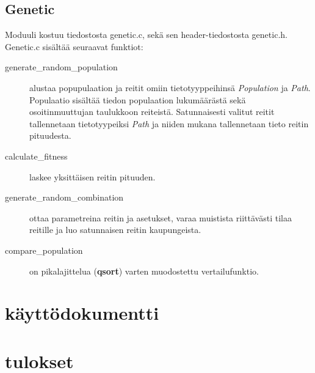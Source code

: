 \documentclass[12pt]{article}
\numberwithin{equation}{section}
\numberwithin{table}{section}
\begin{document}
\subsection{Genetic}
Moduuli kostuu tiedostosta genetic.c, sekä sen header-tiedostosta genetic.h. Genetic.c sisältää seuraavat funktiot:
\begin{description}
\item[generate\_random\_population] alustaa popupulaation ja reitit omiin tietotyyppeihinsä \emph{Population} ja \emph{Path}. Populaatio sisältää tiedon populaation lukumäärästä sekä osoitinmuuttujan taulukkoon reiteistä. Satunnaisesti valitut reitit tallennetaan tietotyypeiksi \emph{Path} ja niiden mukana tallennetaan tieto reitin pituudesta.
\item[calculate\_fitness] laskee yksittäisen reitin pituuden.
\item[generate\_random\_combination] ottaa parametreina reitin ja asetukset, varaa muistista riittävästi tilaa reitille ja luo satunnaisen reitin kaupungeista.
\item[compare\_population] on pikalajittelua (\textbf{qsort}) varten muodostettu vertailufunktio.
\

\end{description}



\section{käyttödokumentti}
\section{tulokset}
\end{document}

